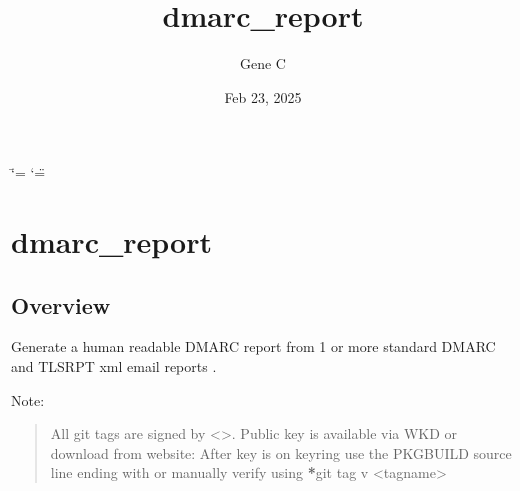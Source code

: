 \documentclass[letterpaper,10pt,english]{sphinxmanual}
\title{dmarc\_report}
\date{Feb 23, 2025}
\author{Gene C}
\begin{document}
\ifdefined\shorthandoff
  \ifnum\catcode`\=\string=\active\shorthandoff{=}\fi
  \ifnum\catcode`\"=\active{}\fi
\fi

\pagestyle{empty}
\sphinxmaketitle
\pagestyle{plain}
\sphinxtableofcontents
\pagestyle{normal}
\label{\detokenize{index::doc}}


\sphinxstepscope


\chapter{dmarc\_report}
\label{\detokenize{README:dmarc-report}}\label{\detokenize{README::doc}}

\section{Overview}
\label{\detokenize{README:overview}}
\sphinxAtStartPar
Generate a human readable DMARC report from 1 or more standard DMARC and TLS\sphinxhyphen{}RPT xml email reports .

\sphinxAtStartPar
Note:
\begin{quote}

\sphinxAtStartPar
All git tags are signed by \textless{}\textgreater{}.
Public key is available via WKD or download from website:
After key is on keyring use the PKGBUILD source line ending with 
or manually verify using {\color{red}\bfseries{}*}git tag \sphinxhyphen{}v \textless{}tag\sphinxhyphen{}name\textgreater{}
\end{quote}
\end{document}
